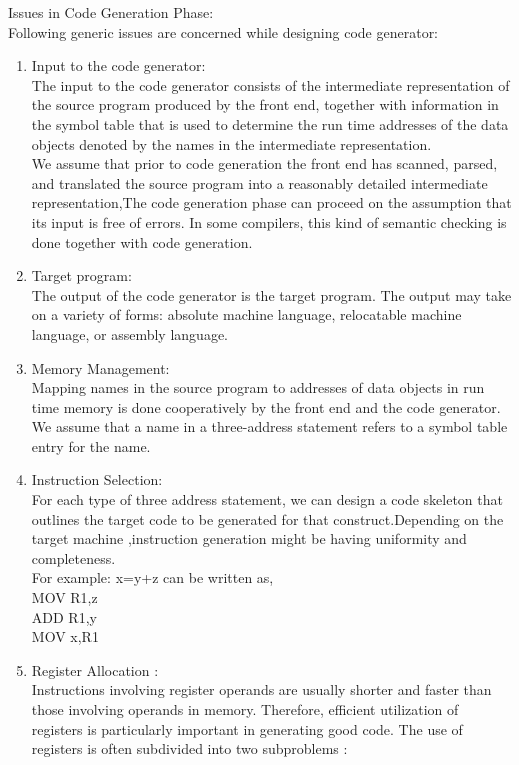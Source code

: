 \documentclass[11pt]{article}
\begin{document}
	\noindent
	Issues in Code Generation Phase:\\
	Following generic issues are concerned while designing code generator:\\
	\begin{enumerate}
		\item Input to the code generator:\\
		The input to the code generator consists of the intermediate representation of the source program produced by the front end, together with information in the symbol table that is used to determine the run time addresses of the data objects denoted by the names in the intermediate representation.\\
		We assume that prior to code generation the front end has scanned, parsed, and translated the source program into a reasonably detailed intermediate representation,The code generation phase can proceed on the assumption that its input is free of errors. In some compilers, this kind of semantic checking is done together with code generation.\\
		\item Target program:\\
		The output of the code generator is the target program. The output may take on a variety of forms: absolute machine language, relocatable machine language, or assembly language.\\
		\item Memory Management:\\
		Mapping names in the source program to addresses of data objects in run time memory is done cooperatively by the front end and the code generator. We assume that a name in a three-address statement refers to a symbol table entry for the name.\\
		\item Instruction Selection:\\
		For each type of three address statement, we can design a code skeleton that outlines the target code to be generated for that construct.Depending on the target machine ,instruction generation might be having uniformity and completeness.\\
		For example: x=y+z can be written as,\\
		MOV R1,z\\
		ADD R1,y\\
		MOV x,R1\\
		\item Register Allocation :\\
		Instructions involving register operands are usually shorter and faster than those involving operands in memory. Therefore, efficient utilization of registers is particularly important in generating good code. The use of registers is often subdivided into two subproblems :\\

\end{enumerate}
\end{document}
